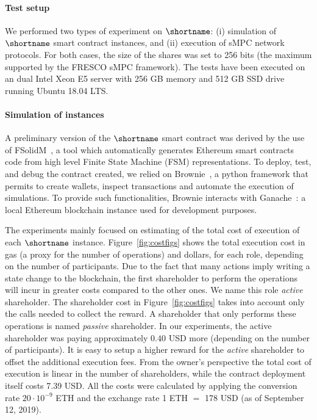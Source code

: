 \paragraph*{Test setup}
We performed two types of experiment on $\shortname$: (i) simulation of $\shortname$ smart contract instances, and (ii) execution of sMPC network protocols. 
For both cases, the size of the shares was set to 256 bits (the maximum supported by the FRESCO sMPC framework).
The tests have been executed on an dual Intel Xeon E5 server with 256 GB memory and 512 GB SSD drive running Ubuntu 18.04 LTS.

\medskip

\paragraph*{Simulation of \shortname instances}
A preliminary version of the $\shortname$ smart contract was derived by the use of FSolidM~\cite{Mavridou2017DesigningSE}, a tool which automatically generates Ethereum smart contracts code from high level Finite State Machine (FSM) representations.
To deploy, test, and debug the contract created, we relied on Brownie~\cite{brownie}, a python framework that permits to create wallets, inspect transactions and automate the execution of simulations.
To provide such functionalities, Brownie interacts with Ganache~\cite{ganache}: a local Ethereum blockchain instance used for development purposes.

The experiments mainly focused on estimating of the total cost of execution of each $\shortname$ instance. 
Figure~\ref{fig:costfigs} shows the total execution cost in gas (a proxy for the number of operations) and dollars, for each role, depending on the number of participants.
%
Due to the fact that many \shortname actions imply writing a state change to the blockchain, the first shareholder to perform the operations will incur in greater costs compared to the other ones. We name this role {\em active} shareholder.
The shareholder cost in Figure~\ref{fig:costfigs} takes into account only the calls needed to collect the reward. A shareholder that only performs these operations is named {\em passive} shareholder.
In our experiments, the active shareholder was paying approximately $0.40$ USD more (depending on the number of participants). It is easy to setup a higher reward for the {\em active} shareholder to offset the additional execution fees.
From the owner's perspective the total cost of execution is linear in the number of shareholders, while the contract deployment itself costs 7.39 USD.
All the costs were calculated by applying the conversion rate {$20 \cdot 10^{-9}$ ETH} and the exchange rate {1 ETH $=$ 178 USD} (as of September 12, 2019).

